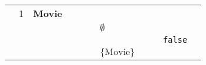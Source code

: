 \begin{table}[]
\begin{tabular}{lllllllllll}
                          & \cellcolor[HTML]{FC8D59}1 & \textbf{Movie}    &                                                               &                                                                                                                 &                           &                                                             &                                                                            &                                                                                          &                                        &                                                                                                                 \\
                          &                           &                   &                                                               &                                                                                                                 &                           & \cellcolor[HTML]{FC8D59}$\emptyset$                         &                                                                            &                                                                                          &                                        &                                                                                                                 \\
                          &                           &                   &                                                               &                                                                                                                 &                           &                                                             &                                                                            &                                                                                          & \cellcolor[HTML]{FC8D59}\texttt{false} &                                                                                                                 \\
                          &                           &                   &                                                               &                                                                                                                 &                           & \cellcolor[HTML]{FC8D59}$\{\text{Movie}\}$                  &                                                                            &                                                                                          &                                        &                                                                                                                 \\

\end{tabular}
\end{table}
